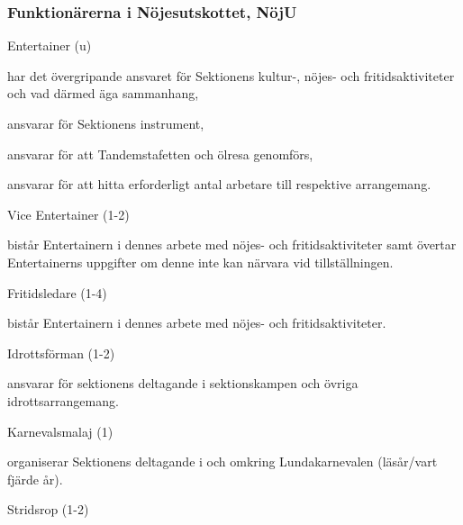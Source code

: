 \documentclass[10pt]{article}
\begin{document}
\subsubsection{Funktionärerna i Nöjesutskottet, NöjU}

\begin{emptylist}
    \item Entertainer (u)
        \begin{dashlist}
            \item har det övergripande ansvaret för Sektionens kultur-,
                nöjes- och fritidsaktiviteter och vad därmed äga sammanhang,
            \item ansvarar för Sektionens instrument,
            \item ansvarar för att Tandemstafetten och ölresa
                genomförs,
            \item ansvarar för att hitta erforderligt antal arbetare till
                respektive arrangemang.
        \end{dashlist}
    \item Vice Entertainer (1-2)
        \begin{dashlist}
            \item bistår Entertainern i dennes arbete med nöjes- och
                fritidsaktiviteter samt övertar Entertainerns uppgifter
                om denne inte kan närvara vid tillställningen.
        \end{dashlist}
    \item Fritidsledare (1-4)
        \begin{dashlist}
            \item bistår Entertainern i dennes arbete med nöjes- och
                fritidsaktiviteter.
        \end{dashlist}
    \item Idrottsförman (1-2)
        \begin{dashlist}
            \item ansvarar för sektionens deltagande i sektionskampen och
                övriga idrottsarrangemang.
        \end{dashlist}
    \item Karnevalsmalaj (1)
        \begin{dashlist}
            \item organiserar Sektionens deltagande i och omkring
                Lundakarnevalen (läsår/vart fjärde år).
        \end{dashlist}
    \item Stridsrop (1-2)

\end{emptylist}
\end{document}
